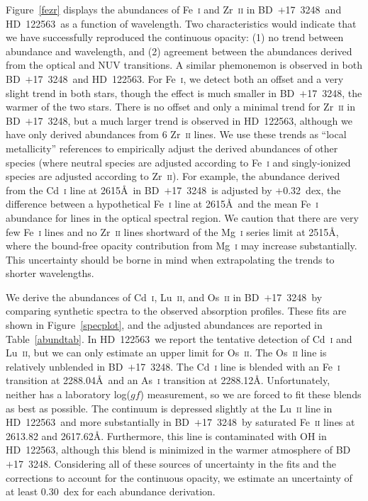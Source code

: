 \documentclass{emulateapj}
\def\bd{\mbox{BD~$+$17~3248}}
\def\hd{\mbox{HD~122563}}
\begin{document}
Figure~\ref{fezr} displays the abundances of Fe~\textsc{i} and Zr~\textsc{ii}
in \bd\ and \hd\ as a function of wavelength.
Two characteristics would indicate that we have successfully
reproduced the continuous opacity:
(1) no trend between abundance and wavelength, and 
(2) agreement between the abundances derived from the 
optical and NUV transitions.
A similar phemonemon is observed in both \bd\ and \hd.
For Fe~\textsc{i}, we detect both an offset and a very slight trend
in both stars, though the effect is much smaller in 
\bd, the warmer of the two stars.
There is no offset and only a minimal trend for Zr~\textsc{ii} in \bd,
but a much larger trend is observed in \hd, although 
we have only derived abundances from 6 Zr~\textsc{ii} lines.
We use these trends as ``local metallicity'' references to
empirically adjust the derived abundances of other species
(where neutral species are adjusted according to Fe~\textsc{i}
and singly-ionized species are adjusted according to Zr~\textsc{ii}).
For example, the abundance derived from the Cd~\textsc{i} line at 2615\AA\
in \bd\ is adjusted by $+$0.32~dex, the difference between 
a hypothetical Fe~\textsc{i} line at 2615\AA\ and the mean Fe~\textsc{i}
abundance for lines in the optical spectral region.
We caution that there are very few Fe~\textsc{i} lines and no
Zr~\textsc{ii} lines shortward of the 
Mg~\textsc{i} series limit at 2515\AA, where the bound-free
opacity contribution from Mg~\textsc{i} may increase substantially.
This uncertainty should be borne in mind when extrapolating the trends to 
shorter wavelengths.

We derive the abundances of Cd~\textsc{i}, Lu~\textsc{ii}, and
Os~\textsc{ii} in \bd\ by comparing synthetic spectra to the
observed absorption profiles.
These fits are shown in Figure~\ref{specplot}, and the adjusted
abundances are reported in Table~\ref{abundtab}.
In \hd\ we report the tentative detection of 
Cd~\textsc{i} and Lu~\textsc{ii}, but 
we can only estimate an upper limit for Os~\textsc{ii}.
The Os~\textsc{ii} line is relatively unblended in \bd.
The Cd~\textsc{i} line is blended with 
an Fe~\textsc{i} transition at 2288.04\AA\ and an
As~\textsc{i} transition at 2288.12\AA.
Unfortunately, neither
has a laboratory log($gf$) measurement, so we are forced 
to fit these blends as best as possible.
The continuum is depressed slightly at the Lu~\textsc{ii} line in
\hd\ and more substantially in \bd\ by saturated Fe~\textsc{ii}
lines at 2613.82 and 2617.62\AA.
Furthermore, this line is contaminated with OH in \hd, although
this blend is minimized in the warmer atmosphere of \bd.
Considering all of these sources of uncertainty in the fits and
the corrections to account for the continuous opacity, we 
estimate an uncertainty of at least 0.30~dex for each
abundance derivation.
\end{document}
